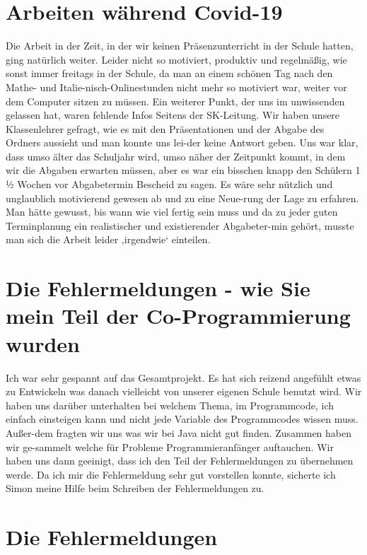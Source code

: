 \documentclass[a4paper, 12pt]{article}
\begin{document}
\section{Arbeiten während Covid-19}
Die Arbeit in der Zeit, in der wir keinen Präsenzunterricht in der Schule hatten, ging natürlich weiter. Leider nicht so motiviert, produktiv und regelmäßig, wie sonst immer freitags in der Schule, da man an einem schönen Tag nach den Mathe- und Italie-nisch-Onlinestunden nicht mehr so motiviert war, weiter vor dem Computer sitzen zu müssen. Ein weiterer Punkt, der uns im unwissenden gelassen hat, waren fehlende Infos Seitens der SK-Leitung. Wir haben unsere Klassenlehrer gefragt, wie es mit den Präsentationen und der Abgabe des Ordners aussieht und man konnte uns lei-der keine Antwort geben. Uns war klar, dass umso älter das Schuljahr wird, umso näher der Zeitpunkt kommt, in dem wir die Abgaben erwarten müssen, aber es war ein bisschen knapp den Schülern 1 ½ Wochen vor Abgabetermin Bescheid zu sagen. Es wäre sehr nützlich und unglaublich motivierend gewesen ab und zu eine Neue-rung der Lage zu erfahren. Man hätte gewusst, bis wann wie viel fertig sein muss und da zu jeder guten Terminplanung ein realistischer und existierender Abgabeter-min gehört, musste man sich die Arbeit leider ‚irgendwie‘ einteilen. 

\section{Die Fehlermeldungen - wie Sie mein Teil der Co-Programmierung wurden}
Ich war sehr gespannt auf das Gesamtprojekt. Es hat sich reizend angefühlt etwas zu Entwickeln was danach vielleicht von unserer eigenen Schule benutzt wird. Wir haben uns darüber unterhalten bei welchem Thema, im Programmcode, ich einfach einsteigen kann und nicht jede Variable des Programmcodes wissen muss. Außer-dem fragten wir uns was wir bei Java nicht gut finden. Zusammen haben wir ge-sammelt welche für Probleme Programmieranfänger auftauchen. Wir haben uns dann geeinigt, dass ich den Teil der Fehlermeldungen zu übernehmen werde.  Da ich mir die Fehlermeldung sehr gut vorstellen konnte, sicherte ich Simon meine Hilfe beim Schreiben der Fehlermeldungen zu.

\section{Die Fehlermeldungen}
\end{document}
